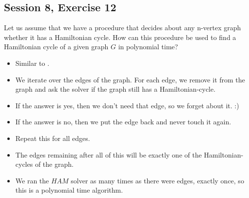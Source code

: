 \subsection {Session 8, Exercise 12}
\label{8_12}


Let us assume that we have a procedure that decides about any n-vertex graph whether it has a Hamiltonian
cycle. How can this procedure be used to find a Hamiltonian cycle of a given graph $G$ in polynomial time?


\begin{itemize}
    \item Similar to .
    \item We iterate over the edges of the graph. For each edge, we remove it from the graph and ask the solver if the graph still has a Hamiltonian-cycle.
    \item If the answer is yes, then we don't need that edge, so we forget about it. :)
    \item If the answer is no, then we put the edge back and never touch it again.
    \item Repeat this for all edges.
    \item The edges remaining after all of this will be exactly one of the Hamiltonian-cycles of the graph.
    \item We ran the $HAM$ solver as many times as there were edges, exactly once, so this is a polynomial time algorithm.
\end{itemize}

